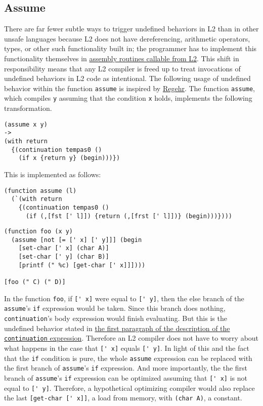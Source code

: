 \documentclass[twocolumn,landscape]{article}
\begin{document}
    \subsection{Assume}\label{sec:assume}
      There are far fewer subtle ways to trigger undefined behaviors in L2 than in other unsafe languages because L2 does not have dereferencing, arithmetic operators, types, or other such functionality built in; the programmer has to implement this functionality themselves in \href{https://raw.githubusercontent.com/murisi/L2/master/assets/i386.s}{assembly routines callable from L2}. This shift in responsibility means that any L2 compiler is freed up to treat invocations of undefined behaviors in L2 code as intentional. The following usage of undefined behavior within the function \lstinline{assume} is inspired by \href{https://blog.regehr.org/archives/1096}{Regehr}. The function \lstinline{assume}, which compiles \lstinline{y} assuming that the condition \lstinline{x} holds, implements the following transformation.
      \begin{lstlisting}
(assume x y)
->
(with return
  {(continuation tempas0 ()
    (if x {return y} (begin)))})
      \end{lstlisting}
      This is implemented as follows:
      \begin{lstlisting}[caption={assume.l2}]
(function assume (l)
  (`(with return
    {(continuation tempas0 ()
      (if (,[fst [' l]]) {return (,[frst [' l]])} (begin)))})))
      \end{lstlisting}
      
      \begin{lstlisting}[caption={test10.l2}]
(function foo (x y)
  (assume [not [= [' x] [' y]]] (begin
    [set-char [' x] (char A)]
    [set-char [' y] (char B)]
    [printf (" %c) [get-char [' x]]])))

[foo (" C) (" D)]
      \end{lstlisting}
      In the function \lstinline{foo}, if \lstinline{[' x]} were equal to \lstinline{[' y]}, then the else branch of the \lstinline{assume}'s \lstinline{if} expression would be taken. Since this branch does nothing, \lstinline{continuation}'s body expression would finish evaluating. But this is the undefined behavior stated in \hyperref[sec:continuation]{the first paragraph of the description of the \lstinline{continuation} expression}. Therefore an L2 compiler does not have to worry about what happens in the case that \lstinline{[' x]} equals \lstinline{[' y]}. In light of this and the fact that the \lstinline{if} condition is pure, the whole \lstinline{assume} expression can be replaced with the first branch of \lstinline{assume}'s \lstinline{if}  expression. And more importantly, the the first branch of \lstinline{assume}'s \lstinline{if} expression can be optimized assuming that \lstinline{[' x]} is not equal to \lstinline{[' y]}. Therefore, a hypothetical optimizing compiler would also replace the last \lstinline{[get-char [' x]]}, a load from memory, with \lstinline{(char A)}, a constant.
\end{document}
